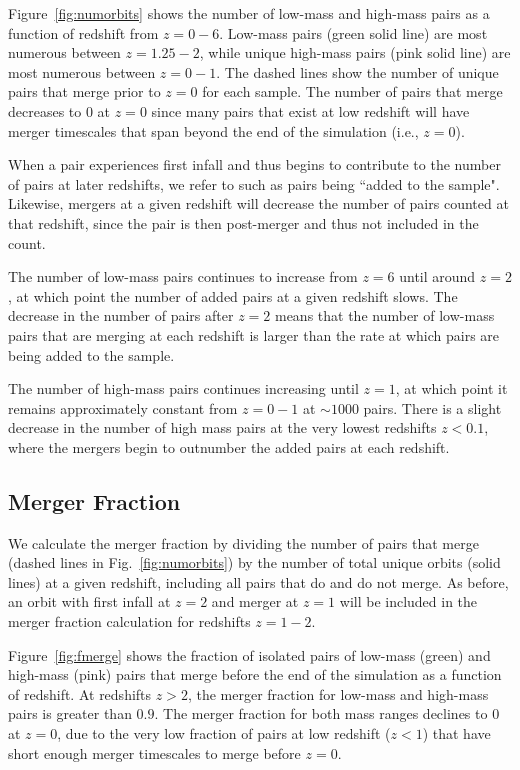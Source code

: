 \documentclass[twocolumn,linenumbers]{aastex631}
\begin{document}
Figure~\ref{fig:numorbits} shows the number of low-mass and high-mass pairs as a function of redshift from $z=0-6$. 
Low-mass pairs (green solid line) are most numerous between $z=1.25-2$, while unique high-mass pairs (pink solid line) are most numerous between $z=0-1$.
The dashed lines show the number of unique pairs that merge prior to $z=0$ for each sample. 
The number of pairs that merge decreases to 0 at $z=0$ since many pairs that exist at low redshift will have merger timescales that span beyond the end of the simulation (i.e., $z=0$). 

When a pair experiences first infall and thus begins to contribute to the number of pairs at later redshifts, we refer to such as pairs being ``added to the sample".
Likewise, mergers at a given redshift will decrease the number of pairs counted at that redshift, since the pair is then post-merger and thus not included in the count.

The number of low-mass pairs continues to increase from $z=6$ until around $z=2$, at which point the number of added pairs at a given redshift slows. 
The decrease in the number of pairs after $z=2$ means that the number of low-mass pairs that are merging at each redshift is larger than the rate at which pairs are being added to the sample.

The number of high-mass pairs continues increasing until $z=1$, at which point it remains approximately constant from $z=0-1$ at $\sim1000$ pairs. 
There is a slight decrease in the number of high mass pairs at the very lowest redshifts $z<0.1$, where the mergers begin to outnumber the added pairs at each redshift.


\subsection{Merger Fraction}
We calculate the merger fraction by dividing the number of pairs that merge (dashed lines in Fig.~\ref{fig:numorbits}) by the number of total unique orbits (solid lines) at a given redshift, including all pairs that do and do not merge. 
As before, an orbit with first infall at $z=2$ and merger at $z=1$ will be included in the merger fraction calculation for redshifts $z=1-2$.

Figure~\ref{fig:fmerge} shows the fraction of isolated pairs of low-mass (green) and high-mass (pink) pairs that merge before the end of the simulation as a function of redshift. 
At redshifts $z>2$, the merger fraction for low-mass and high-mass pairs is greater than $0.9$.
The merger fraction for both mass ranges declines to $0$ at $z=0$, due to the very low fraction of pairs at low redshift ($z<1$) that have short enough merger timescales to merge before $z=0$.
\end{document}
